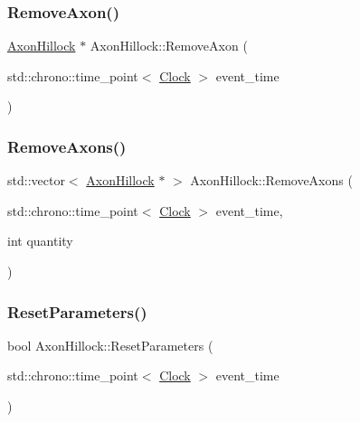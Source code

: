 \mbox{\label{classAxonHillock_ae7c379ef3a70c8a43a0f105ccc94b54b}} 
\subsubsection{\texorpdfstring{Remove\+Axon()}{RemoveAxon()}}
{\footnotesize\ttfamily \mbox{\hyperlink{classAxonHillock}{Axon\+Hillock}} $\ast$ Axon\+Hillock\+::\+Remove\+Axon (\begin{DoxyParamCaption}\item[{std\+::chrono\+::time\+\_\+point$<$ \mbox{\hyperlink{universe_8h_a0ef8d951d1ca5ab3cfaf7ab4c7a6fd80}{Clock}} $>$}]{event\+\_\+time }\end{DoxyParamCaption})}

\mbox{\label{classAxonHillock_a7f10edff727271408887d29a70e7e671}} 
\subsubsection{\texorpdfstring{Remove\+Axons()}{RemoveAxons()}}
{\footnotesize\ttfamily std\+::vector$<$ \mbox{\hyperlink{classAxonHillock}{Axon\+Hillock}} $\ast$ $>$ Axon\+Hillock\+::\+Remove\+Axons (\begin{DoxyParamCaption}\item[{std\+::chrono\+::time\+\_\+point$<$ \mbox{\hyperlink{universe_8h_a0ef8d951d1ca5ab3cfaf7ab4c7a6fd80}{Clock}} $>$}]{event\+\_\+time,  }\item[{int}]{quantity }\end{DoxyParamCaption})}

\mbox{\label{classAxonHillock_acec1571ef0b74f7f5ce6699c9b459b4f}} 
\subsubsection{\texorpdfstring{Reset\+Parameters()}{ResetParameters()}}
{\footnotesize\ttfamily bool Axon\+Hillock\+::\+Reset\+Parameters (\begin{DoxyParamCaption}\item[{std\+::chrono\+::time\+\_\+point$<$ \mbox{\hyperlink{universe_8h_a0ef8d951d1ca5ab3cfaf7ab4c7a6fd80}{Clock}} $>$}]{event\+\_\+time }\end{DoxyParamCaption})}

